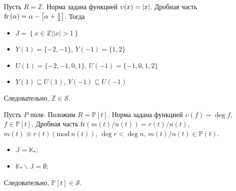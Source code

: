 \documentclass[_00_autoref.tex]{subfiles}
\begin{document}
\begin{example}\label{example:Z}
    Пусть $R = \mathbb{Z}$.
    Норма задана функцией $\upsilon(x) = |x|$.
    Дробная часть $\textrm{fr}\left(\alpha\right) = \alpha - \left[\alpha + \frac{1}{2}\right]$.
    Тогда
    \begin{itemize}
        \item $J = \left\{x \in \mathbb{Z} \big| |x| > 1\right\}$
        
        \item $Y(1) = \{-2, -1\}$, $Y(-1) = \{1, 2\}$
        
        \item $U(1) = \{-2, -1, 0, 1\}$, $U(-1) = \{-1, 0, 1, 2\}$
        
        \item $Y(1) \subseteq U(1)$, $Y(-1) \subseteq U(-1)$
    \end{itemize}
    
    Следовательно, $\mathbb{Z} \in \mathcal{S}$.
\end{example}

\begin{example}\label{example:P[t]}
    Пусть $P$ поле.
    Положим $R = \mathbb{P}[t]$.
    Норма задана функцией $\upsilon(f)=\deg f$, $f \in \mathbb{P}[t]$.
    Дробная часть $\textrm{fr}(m(t)/n(t))=r(t)/n(t)$, $m(t)\equiv r(t)(\textrm{mod}\ n(t))$, $\deg r < \deg n$, $m(t)/n(t) \in \mathbb{P}(t).$

    \begin{itemize}
        \item $\mathbb{J}=\mathbb{K}_{*}$;

        \item $\mathbb{K}_{*}\backslash\mathbb{J} = \emptyset$;
    \end{itemize}

    Следовательно, $\mathbb{P}[t] \in \mathcal{S}$.
\end{example}
\end{document}
